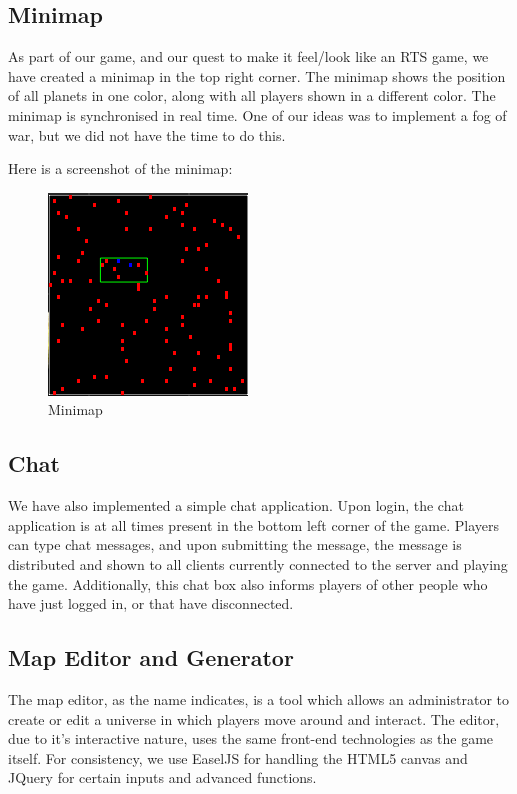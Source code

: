 \documentclass[a4paper,11pt]{article}
\begin{document}
		\subsection{Minimap}
			
			As part of our game, and our quest to make it feel/look like an RTS game, we have created a minimap in the top right corner. The minimap shows the position of all planets in one color, along with all players shown in a different color. The minimap is synchronised in real time. One of our ideas was to implement a fog of war, but we did not have the time to do this.
			
			Here is a screenshot of the minimap:
			
			\begin{figure}[htb]
			\begin{center}
			\leavevmode
			\includegraphics[scale=0.7]{minimap.png}
			\end{center}
			\caption{Minimap}
			\label{fig:minimap}
			\end{figure}
			
			
		\subsection{Chat}
			We have also implemented a simple chat application. Upon login, the chat application is at all times present in the bottom left corner of the game. Players can type chat messages, and upon submitting the message, the message is distributed and shown to all clients currently connected to the server and playing the game. Additionally, this chat box also informs players of other people who have just logged in, or that have disconnected.
			
		\subsection{Map Editor and Generator}
		
		The map editor, as the name indicates, is a tool which allows an administrator to create or edit a universe in which players move around and interact. The editor, due to it's interactive nature, uses the same front-end technologies as the game itself. For consistency, we use EaselJS for handling the HTML5 canvas and JQuery for certain inputs and advanced functions.
\end{document}
